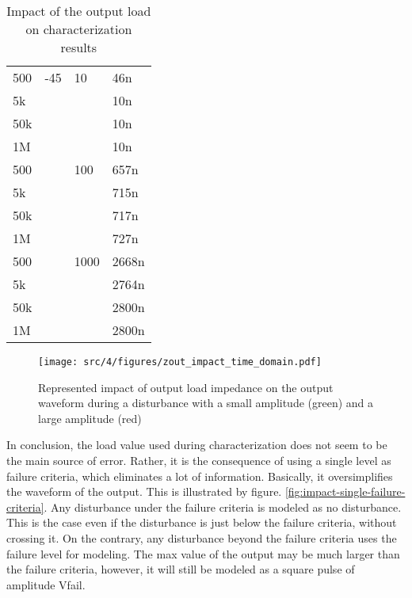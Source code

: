 \begin{table}[!htbp]
\begin{tabular}{llll}
500               & -45        & 10         & 46n    \\
5k                &            &            & 10n    \\
50k               &            &            & 10n    \\
1M                &            &            & 10n    \\
\rowcolor[gray]{.95}
500               &            & 100        & 657n    \\ \rowcolor[gray]{.95}
5k                &            &            & 715n    \\ \rowcolor[gray]{.95}
50k               &            &            & 717n    \\ \rowcolor[gray]{.95}
1M                &            &            & 727n    \\

500               &            & 1000       & 2668n    \\
5k                &            &            & 2764n   \\
50k               &            &            & 2800n    \\
1M                &            &            & 2800n    \\

\bottomrule
\end{tabular}
\caption{Impact of the output load on characterization results}
\label{tab:impact-load-on-cz}
\end{table}

\begin{figure}[!htbp]
  \centering
  \texttt{[image: src/4/figures/zout\_impact\_time\_domain.pdf]}
  \caption{Represented impact of output load impedance on the output waveform during a disturbance with a small amplitude (green) and a large amplitude (red)}
  \label{fig:impact-time-domain-load}
\end{figure}

In conclusion, the load value used during characterization does not seem to be the main source of error.
Rather, it is the consequence of using a single level as failure criteria, which eliminates a lot of information.
Basically, it oversimplifies the waveform of the output.
This is illustrated by figure. \ref{fig:impact-single-failure-criteria}.
Any disturbance under the failure criteria is modeled as no disturbance.
This is the case even if the disturbance is just below the failure criteria, without crossing it.
On the contrary, any disturbance beyond the failure criteria uses the failure level for modeling.
The max value of the output may be much larger than the failure criteria, however, it will still be modeled as a square pulse of amplitude Vfail.

